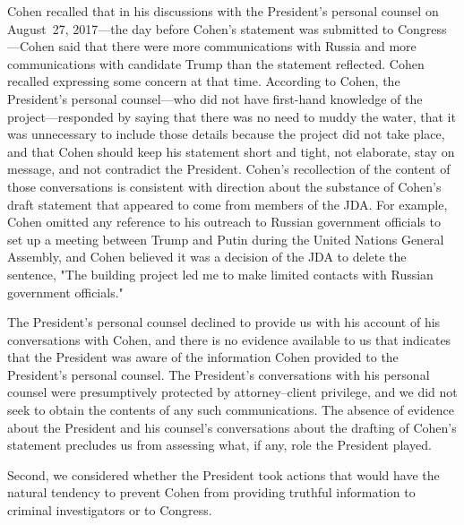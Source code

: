 Cohen recalled that in his discussions with the President's personal counsel on August~27, 2017---the day before Cohen's statement was submitted to Congress---Cohen said that there were more communications with Russia and more communications with candidate Trump than the statement reflected.
Cohen recalled expressing some concern at that time.
According to Cohen, the President's personal counsel---who did not have first-hand knowledge of the project---responded by saying that there was no need to muddy the water, that it was unnecessary to include those details because the project did not take place, and that Cohen should keep his statement short and tight, not elaborate, stay on message, and not contradict the President.
Cohen's recollection of the content of those conversations is consistent with direction about the substance of Cohen's draft statement that appeared to come from members of the JDA\null.
For example, Cohen omitted any reference to his outreach to Russian government officials to set up a meeting between Trump and Putin during the United Nations General Assembly, and Cohen believed it was a decision of the JDA to delete the sentence, "The building project led me to make limited contacts with Russian government officials."

The President's personal counsel declined to provide us with his account of his conversations with Cohen, and there is no evidence available to us that indicates that the President was aware of the information Cohen provided to the President's personal counsel.
The President's conversations with his personal counsel were presumptively protected by attorney--client privilege, and we did not seek to obtain the contents of any such communications.
The absence of evidence about the President and his counsel's conversations about the drafting of Cohen's statement precludes us from assessing what, if any, role the President played.

Second, we considered whether the President took actions that would have the natural tendency to prevent Cohen from providing truthful information to criminal investigators or to Congress.

